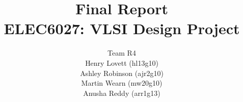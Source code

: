 \documentclass[draft, 12pt, titlepage,twoside]{report}
\author{Team R4 \\ Henry Lovett (hl13g10) \\ Ashley Robinson (ajr2g10) \\ Martin Wearn (mw20g10) \\ Anusha Reddy (arr1g13)}
\title{Final Report \\ ELEC6027: VLSI Design Project \todo{Format title page}}
\begin{document}
\maketitle
\listoftodos
\tableofcontents






\appendix



\end{document}
